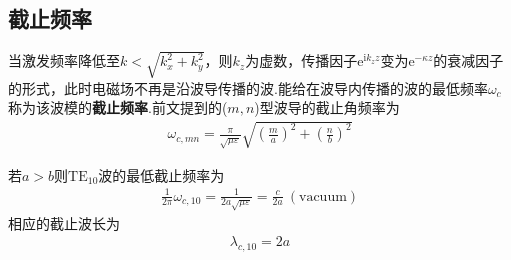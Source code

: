 \documentclass[main.tex]{subfiles}
\begin{document}
\subsection{截止频率}
当激发频率降低至$\displaystyle k<\sqrt{k_x^2 + k_y^2}$，则$k_z$为虚数，传播因子$\mathrm{e}^{\mathrm{i} k_z z}$变为$\mathrm{e}^{-\kappa z}$的衰减因子的形式，此时电磁场不再是沿波导传播的波.能给在波导内传播的波的最低频率$\omega _c$称为该波模的\textbf{截止频率}.前文提到的($m,n$)型波导的截止角频率为
\begin{align}
    \omega_{c,mn} = \frac{\pi}{\sqrt{\mu \varepsilon}}\sqrt{\left(\frac{m}{a}\right)^2 + \left(\frac{n}{b}\right)^2}
\end{align}

若$a>b$则$\mathrm{TE}_10$波的最低截止频率为
\begin{align}
    \frac{1}{2\pi}\omega_{c,10} = \frac{1}{2a\sqrt{\mu \varepsilon}} = \frac{c}{2a}\ \mathrm{(vacuum)}
\end{align}
相应的截止波长为
\begin{align}
    \lambda _{c,10} = 2a
\end{align}
\end{document}

